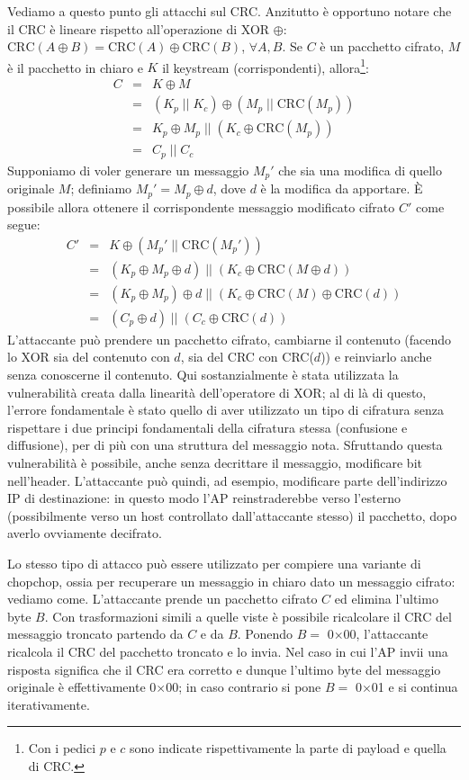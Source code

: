 Vediamo a questo punto gli attacchi sul CRC. Anzitutto è opportuno notare che il CRC è lineare rispetto all'operazione di XOR $\oplus$: $\text{CRC}(A \oplus B) = \text{CRC}(A) \oplus \text{CRC}(B)$, $\forall A, B$. Se $C$ è un pacchetto cifrato, $M$ è il pacchetto in chiaro e $K$ il keystream (corrispondenti), allora\footnote{Con i pedici $p$ e $c$ sono indicate rispettivamente la parte di payload e quella di CRC.}:
\begin{eqnarray*}
C &=& K \oplus M \\
&=& (K_p \; || \; K_c) \oplus (M_p \; || \; \text{CRC}(M_p))\\
&=& K_p \oplus M_p \; || \; (K_c \oplus \text{CRC}(M_p))\\
&=& C_p \; || \; C_c
\end{eqnarray*}
Supponiamo di voler generare un messaggio $M_p'$ che sia una modifica di quello originale $M$; definiamo $M_p' = M_p \oplus d$, dove $d$ è la modifica da apportare. È possibile allora ottenere il corrispondente messaggio modificato cifrato $C'$ come segue:
\begin{eqnarray*}
C' &=& K \oplus (M_p' \; || \; \text{CRC}(M_p'))\\
&=& (K_p \oplus M_p \oplus d) \; || \; (K_c \oplus \text{CRC}(M \oplus d))\\
&=& (K_p \oplus M_p) \oplus d \; || \; (K_c \oplus \text{CRC}(M) \oplus \text{CRC}(d))\\
&=& (C_p \oplus d) \; || \; (C_c \oplus \text{CRC}(d))
\end{eqnarray*}
L'attaccante può prendere un pacchetto cifrato, cambiarne il contenuto (facendo lo XOR sia del contenuto con $d$, sia del CRC con CRC($d$)) e reinviarlo anche senza conoscerne il contenuto. Qui sostanzialmente è stata utilizzata la vulnerabilità creata dalla linearità dell'operatore di XOR; al di là di questo, l'errore fondamentale è stato quello di aver utilizzato un tipo di cifratura senza rispettare i due principi fondamentali della cifratura stessa (confusione e diffusione), per di più con una struttura del messaggio nota. Sfruttando questa vulnerabilità è possibile, anche senza decrittare il messaggio, modificare bit nell'header. L'attaccante può quindi, ad esempio, modificare parte dell'indirizzo IP di destinazione: in questo modo l'AP reinstraderebbe verso l'esterno (possibilmente verso un host controllato dall'attaccante stesso) il pacchetto, dopo averlo ovviamente decifrato.

Lo stesso tipo di attacco può essere utilizzato per compiere una variante di chopchop, ossia per recuperare un messaggio in chiaro dato un messaggio cifrato: vediamo come. L'attaccante prende un pacchetto cifrato $C$ ed elimina l'ultimo byte $B$. Con trasformazioni simili a quelle viste è possibile ricalcolare il CRC del messaggio troncato partendo da $C$ e da $B$. Ponendo $B=$ 0$\times$00, l'attaccante ricalcola il CRC del pacchetto troncato e lo invia. Nel caso in cui l'AP invii una risposta significa che il CRC era corretto e dunque l'ultimo byte del messaggio originale è effettivamente 0$\times$00; in caso contrario si pone $B=$ 0$\times$01 e si continua iterativamente.

